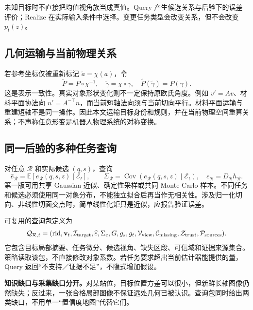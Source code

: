 \documentclass[UTF8,11pt,a4paper,fontset=fandol]{ctexart}
\numberwithin{equation}{section}
\theoremstyle{definition}
\newcommand{\E}{\mathbb E}
\DeclareMathOperator{\Cov}{Cov}
\begin{document}
未知目标时不直接把均值视角族当成真值。Query 产生候选关系与后验下的误差评价；Realize 在实际输入条件中选择。变更任务类型会改变关系，但不会改变 $p_t(z)$。

\subsection{几何运输与当前物理关系}
若参考坐标仅被重新标记 $\widetilde a=\chi(a)$，令
\begin{equation}
\widetilde P=P\circ\chi^{-1},\quad
\widetilde\gamma=\chi\circ\gamma,
\quad \widetilde P(\widetilde\gamma)=P(\gamma).
\label{eq:reparam}
\end{equation}
这是表示一致性。真实对象形状变化则不一定保持原欧氏角度。例如 $v'=Av$、材料平面协法向 $n'=A^{-\top}n$，而当前短轴法向须与当前切向平行。材料平面运输与重建短轴不是同一操作。因此本文运输目标身份和规则，并在当前物理空间重算关系；不声称任意形变是机器人物理系统的对称变换。

\subsection{同一后验的多种任务查询}
对任意 $\mathcal R$ 和实际候选 $(q,s)$，查询
\begin{equation}
\widehat e_{\mathcal R}=\E[e_{\mathcal R}(q,s,z)\mid\mathcal E_t],
\qquad
\Sigma_{\mathcal R}=\Cov(e_{\mathcal R}(q,s,z)\mid\mathcal E_t),
\quad e_{\mathcal R}=D_{\mathcal R}h_{\mathcal R}.
\label{eq:querymoments}
\end{equation}
第一版可用共享 Gaussian 近似、确定性采样或共同 Monte Carlo 样本。不同任务和候选必须使用同一对象分布，不能独立拟合后再当作无相关性。涉及归一化切向、非线性切面交点时，简单线性化矩只是近似，应报告验证误差。

可复用的查询包定义为
\begin{equation}
\mathcal Q_{\mathcal R,t}=
(\mathrm{rid},\mathbf v_t,\mathcal I_{\rm target},\widehat e,\Sigma_e,G,g_s,g_t,
\mathcal V_{\rm view},\mathcal C_{\rm missing},\mathcal Z_{\rm trust},\mathcal P_{\rm sources}).
\label{eq:querypacket}
\end{equation}
它包含目标局部摘要、任务微分、候选视角、缺失区段、可信域和证据来源集合。策略读取该包，不直接修改对象系数。若任务要求超出当前估计器能提供的量，Query 返回“不支持／证据不足”，不隐式增加假设。

\textbf{知识缺口与采集缺口分开。}对某站位，目标位置方差可以很小，但新鲜长轴图像仍然缺失；反过来，一张合格局部图像不保证远处几何已被认识。查询包同时给出两类缺口，不用单一“置信度地图”代替它们。
\end{document}
